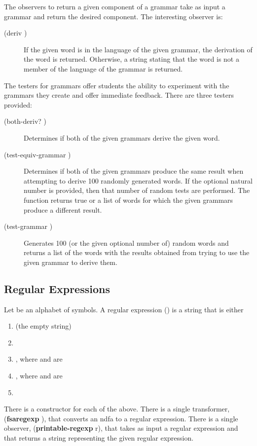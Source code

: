 \documentclass{eptcs}
\begin{document}
The observers to return a given component of a grammar take as input a grammar and return the desired component. The interesting observer is:
\begin{description}
  \item [(deriv  )] If the given word is in the language of the given grammar, the derivation of the word is returned. Otherwise, a string stating that the word is not a member of the language of the grammar is returned.
\end{description}

The testers for grammars offer students the ability to experiment with the grammars they create and offer immediate feedback. There are three testers provided:
\begin{description}
  \item [(both-deriv?   )] Determines if both of the given grammars derive the given word.

  \item [(test-equiv-grammar   )] Determines if both of the given grammars produce the same result when attempting to derive 100 randomly generated words. If the optional natural number is provided, then that number of random tests are performed. The function returns true or a list of words for which the given grammars produce a different result.

  \item [(test-grammar  )] Generates 100 (or the given optional number of) random words and returns a list of the words with the results obtained from trying to use the given grammar to derive them.
\end{description}

\subsection{Regular Expressions}
Let  be an alphabet of symbols. A regular expression () is a string  that is either
\begin{enumerate}
  \item  (the empty string)
  \item 
  \item , where  and  are 
  \item , where  and  are 
  \item 
\end{enumerate}
There is a constructor for each of the above. There is a single transformer, (\textbf{fsaregexp} ), that converts an \textsf{ndfa} to a regular expression. There is a single observer, (\textbf{printable-regexp} r), that takes as input a regular expression and that returns a string representing the given regular expression.
\end{document}
